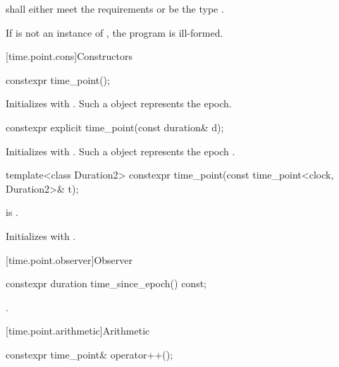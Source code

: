 \pnum
{} shall either
meet the  requirements
or be the type .

\pnum
If  is not an instance of ,
the program is ill-formed.

[time.point.cons]{Constructors}

%
\begin{itemdecl}
constexpr time_point();
\end{itemdecl}

\begin{itemdescr}
\pnum
\effects
Initializes  with .
Such a  object represents the epoch.
\end{itemdescr}

%
\begin{itemdecl}
constexpr explicit time_point(const duration& d);
\end{itemdecl}

\begin{itemdescr}
\pnum
\effects
Initializes  with .
Such a  object represents the epoch .
\end{itemdescr}

%
\begin{itemdecl}
template<class Duration2>
  constexpr time_point(const time_point<clock, Duration2>& t);
\end{itemdecl}

\begin{itemdescr}
\pnum
\constraints
{} is .

\pnum
\effects
Initializes  with .
\end{itemdescr}

[time.point.observer]{Observer}

%
\begin{itemdecl}
constexpr duration time_since_epoch() const;
\end{itemdecl}

\begin{itemdescr}
\pnum
\returns
{}.
\end{itemdescr}

[time.point.arithmetic]{Arithmetic}

%
\begin{itemdecl}
constexpr time_point& operator++();
\end{itemdecl}

